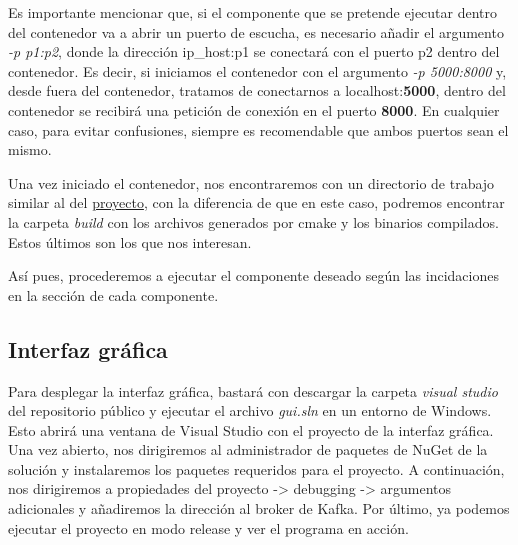 \documentclass[a4paper,12pt]{article}
\begin{document}
Es importante mencionar que, si el componente que se pretende ejecutar dentro del contenedor va a abrir un puerto de escucha,
es necesario añadir el argumento \textit{-p p1:p2}, donde la dirección ip\_host:p1 se conectará con el puerto p2 dentro del contenedor.
Es decir, si iniciamos el contenedor con el argumento \textit{-p 5000:8000} y, desde fuera del contenedor, tratamos de conectarnos a
localhost:\textbf{5000}, dentro del contenedor se recibirá una petición de conexión en el puerto \textbf{8000}. En cualquier caso, para evitar
confusiones, siempre es recomendable que ambos puertos sean el mismo. \par

Una vez iniciado el contenedor, nos encontraremos con un directorio de trabajo similar al del
\href{https://github.com/abtb2-ua/easycab}{proyecto}, con la diferencia de que en este caso, podremos encontrar la carpeta
\textit{build} con los archivos generados por cmake y los binarios compilados. Estos últimos son los que nos interesan. \par

Así pues, procederemos a ejecutar el componente deseado según las incidaciones en la sección de cada componente.

\subsection{Interfaz gráfica}
Para desplegar la interfaz gráfica, bastará con descargar la carpeta \textit{visual studio} del repositorio público y ejecutar
el archivo \textit{gui.sln} en un entorno de Windows. Esto abrirá una ventana de Visual Studio con el proyecto de la interfaz gráfica.
Una vez abierto, nos dirigiremos al administrador de paquetes de NuGet de la solución y instalaremos los paquetes requeridos para el
proyecto. A continuación, nos dirigiremos a propiedades del proyecto -> debugging -> argumentos adicionales y añadiremos la dirección al broker
de Kafka. Por último, ya podemos ejecutar el proyecto en modo release y ver el programa en acción.
\end{document}
